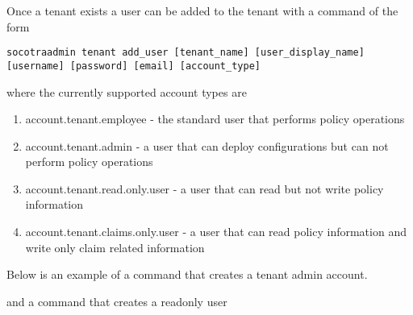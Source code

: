 Once a tenant exists a user can be added to the tenant with a command of
the form

\begin{verbatim}
socotraadmin tenant add_user [tenant_name] [user_display_name] [username] [password] [email] [account_type]
\end{verbatim}

where the currently supported account types are

\begin{enumerate}
\def\labelenumi{\arabic{enumi}.}
\tightlist
\item
  account.tenant.employee - the standard user that performs policy
  operations
\item
  account.tenant.admin - a user that can deploy configurations but can
  not perform policy operations
\item
  account.tenant.read.only.user - a user that can read but not write
  policy information
\item
  account.tenant.claims.only.user - a user that can read policy
  information and write only claim related information
\end{enumerate}

Below is an example of a command that creates a tenant admin account.

\begin{Shaded}
\begin{Highlighting}[]
 
\end{Highlighting}
\end{Shaded}

and a command that creates a readonly user

\begin{Shaded}
\begin{Highlighting}[]
\end{Highlighting}
\end{Shaded}

